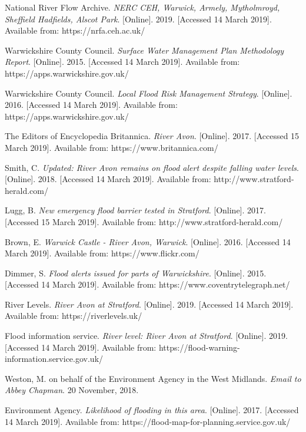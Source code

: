 \documentclass[11pt,a4paper]{article}
\begin{document}
\begin{thebibliography}{}
National River Flow Archive. \textit{NERC CEH, Warwick, Armely, Mytholmroyd, Sheffield Hadfields, Alscot Park}. [Online]. 2019. [Accessed 14 March 2019]. Available from: https://nrfa.ceh.ac.uk/

Warwickshire County Council. \textit{Surface Water Management Plan Methodology Report}. [Online]. 2015. [Accessed 14 March 2019]. Available from: https://apps.warwickshire.gov.uk/

Warwickshire County Council. \textit{Local Flood Risk Management Strategy}. [Online]. 2016. [Accessed 14 March 2019]. Available from: https://apps.warwickshire.gov.uk/

The Editors of Encyclopedia Britannica. \textit{River Avon}. [Online]. 2017. [Accessed 15 March 2019]. Available from:  https://www.britannica.com/

Smith, C. \textit{Updated: River Avon remains on flood alert despite falling water levels}. [Online]. 2018. [Accessed 14 March 2019]. Available from: http://www.stratford-herald.com/

Lugg, B. \textit{New emergency flood barrier tested in Stratford}. [Online]. 2017. [Accessed 15 March 2019]. Available from: http://www.stratford-herald.com/

Brown, E. \textit{Warwick Castle - River Avon, Warwick}. [Online]. 2016. [Accessed 14 March 2019]. Available from: https://www.flickr.com/

Dimmer, S. \textit{Flood alerts issued for parts of Warwickshire}. [Online]. 2015. [Accessed 14 March 2019]. Available from: https://www.coventrytelegraph.net/

River Levels. \textit{River Avon at Stratford}. [Online]. 2019. [Accessed 14 March 2019]. Available from: https://riverlevels.uk/

Flood information service. \textit{River level: River Avon at Stratford}. [Online]. 2019. [Accessed 14 March 2019]. Available from: https://flood-warning-information.service.gov.uk/

Weston, M. on behalf of the Environment Agency in the West Midlands. \textit{Email to Abbey Chapman}. 20 November, 2018.

Environment Agency. \textit{Likelihood of flooding in this area}. [Online]. 2017. [Accessed 14 March 2019]. Available from: https://flood-map-for-planning.service.gov.uk/


\end{thebibliography}
\end{document}
